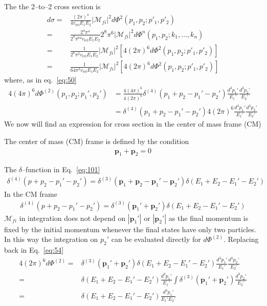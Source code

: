 The the 2--to--2 cross section is
\begin{align}
 \label{eq:54}
  d\sigma=&\frac{(2\pi)^4}{4v_{\text{rel}}E_1E_2}\left|\mathcal{M}_{fi}\right|^2
d\Phi^{2}(p_1,p_2;p'_1,p'_2)\nonumber\\
=&\frac{2^4\pi^4}{2^{8}\pi^64v_{\text{rel}}E_1E_2}2^{8}\pi^6\left|\mathcal{M}_{fi}\right|^2
d\Phi^{n}(p_1,p_2;k_1,\ldots,k_n)\nonumber\\
=&\frac{1}{2^{6}\pi^2v_{\text{rel}}E_1E_2}\left|\mathcal{M}_{fi}\right|^2
\left[4(2\pi)^6d\Phi^{2}(p_1,p_2;p'_1,p'_2)\right]\nonumber\\
=&\frac{1}{64\pi^2v_{\text{rel}}E_1E_2}\left|\mathcal{M}_{fi}\right|^2
\left[4(2\pi)^6d\Phi^{2}(p_1,p_2;p'_1,p'_2)\right]
\end{align}
where, as in eq.~\eqref{eq:50}
\begin{align}
4(4\pi)^6d\Phi^{(2)}(p_1,p_2;p_1',p_2')&= \frac{4(4\pi)^6}{4(2\pi)^6} \delta^{(4)}\left(p_1+p_2-p_1'-p_2'\right)
\frac{d^3p_1'}{E_{1}'}\frac{d^3p_2'}{E_{2}'}\nonumber\\
&=  \delta^{(4)}\left(p_1+p_2-p_1'-p_2'\right)4(2\pi)^6
\frac{d^3p_1'}{E_{1}'}\frac{d^3p_2'}{E_{2}'}
\end{align}
We now will find an expression for cross section in the center of mass frame (CM) 


The center of mass (CM) frame is defined by the condition
\begin{align}
  \label{eq:cm}
  \mathbf{p}_1+\mathbf{p}_2=0
\end{align}


The $\delta$--function in Eq.~\eqref{eq:101}
\begin{align}
\label{eq:56}
  \delta^{(4)}(p+p_2-p_1'-p_2')=\delta^{(3)}(\mathbf{p}_1+\mathbf{p}_2-\mathbf{p}_1'-\mathbf{p}_2')
\delta(E_1+E_2-E_1'-E_2')
\end{align}
In the CM frame
\begin{align}
\label{eq:148}
  \delta^{(4)}(p+p_2-p_1'-p_2')=\delta^{(3)}(\mathbf{p}_1'+\mathbf{p}_2')
\delta(E_1+E_2-E_1'-E_2')
\end{align}
$\mathcal{M}_{fi}$ in integration does not depend on $|\mathbf{p}_1'|$ or $|\mathbf{p}_2'|$ as the final momentum is fixed by the initial momentum whenever the final states have only two particles. In this way the integration on $p_2'$ can be evaluated directly for $d\Phi^{(2)}$. Replacing back in Eq.~\eqref{eq:54}
\begin{align}
\label{eq:149}
  4(2\pi)^6d\Phi^{(2)}=&\delta^{(3)}(\mathbf{p}_1'+\mathbf{p}_2')\delta(E_1+E_2-E_1'-E_2')
\frac{d^3p_1'}{E_{1}'}\frac{d^3p_2'}{E_{2}'}\nonumber\\
 =&\delta(E_1+E_2-E_1'-E_2')
\frac{d^3p_1'}{E_{1}'}\int\delta^{(3)}(\mathbf{p}_1'+\mathbf{p}_2')\frac{d^3p_2'}{E_{2}'}\nonumber\\
=&\delta(E_1+E_2-E_1'-E_2')
\frac{d^3p_1'}{E_{1}'E_{2}'}
\end{align}

